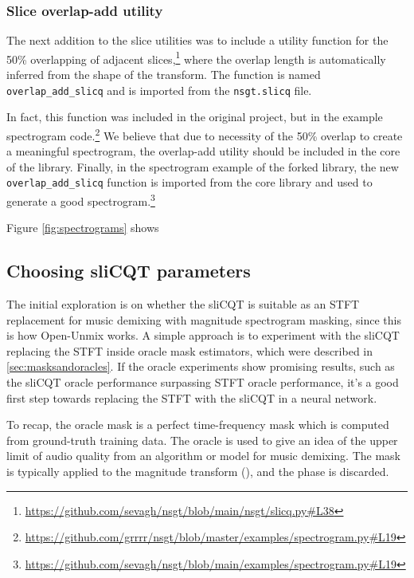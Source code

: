 \documentclass[report.tex]{subfiles}
\begin{document}

\subsubsection{Slice overlap-add utility}

The next addition to the slice utilities was to include a utility function for the 50\% overlapping of adjacent slices,\footnote{\url{https://github.com/sevagh/nsgt/blob/main/nsgt/slicq.py\#L38}} where the overlap length is automatically inferred from the shape of the transform. The function is named \Verb#overlap_add_slicq# and is imported from the \Verb#nsgt.slicq# file.

In fact, this function was included in the original project, but in the example spectrogram code.\footnote{\url{https://github.com/grrrr/nsgt/blob/master/examples/spectrogram.py\#L19}} We believe that due to necessity of the 50\% overlap to create a meaningful spectrogram, the overlap-add utility should be included in the core of the library. Finally, in the spectrogram example of the forked library, the new \Verb#overlap_add_slicq# function is imported from the core library and used to generate a good spectrogram.\footnote{\url{https://github.com/sevagh/nsgt/blob/main/examples/spectrogram.py\#L19}}

Figure \ref{fig:spectrograms} shows

\subsection{Choosing sliCQT parameters}
\label{sec:slicqparamsrch}

The initial exploration is on whether the sliCQT is suitable as an STFT replacement for music demixing with magnitude spectrogram masking, since this is how Open-Unmix works. A simple approach is to experiment with the sliCQT replacing the STFT inside oracle mask estimators, which were described in \ref{sec:masksandoracles}. If the oracle experiments show promising results, such as the sliCQT oracle performance surpassing STFT oracle performance, it's a good first step towards replacing the STFT with the sliCQT in a neural network.

To recap, the oracle mask is a perfect time-frequency mask which is computed from ground-truth training data. The oracle is used to give an idea of the upper limit of audio quality from an algorithm or model for music demixing. The mask is typically applied to the magnitude transform (\cite{umx}), and the phase is discarded.
\end{document}
